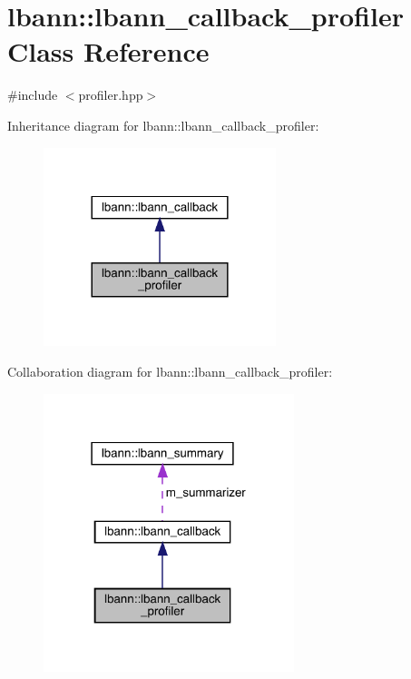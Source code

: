 \hypertarget{classlbann_1_1lbann__callback__profiler}{}\section{lbann\+:\+:lbann\+\_\+callback\+\_\+profiler Class Reference}
\label{classlbann_1_1lbann__callback__profiler}


{\ttfamily \#include $<$profiler.\+hpp$>$}



Inheritance diagram for lbann\+:\+:lbann\+\_\+callback\+\_\+profiler\+:\nopagebreak
\begin{figure}[H]
\begin{center}
\leavevmode
\includegraphics[width=192pt]{classlbann_1_1lbann__callback__profiler__inherit__graph}
\end{center}
\end{figure}


Collaboration diagram for lbann\+:\+:lbann\+\_\+callback\+\_\+profiler\+:\nopagebreak
\begin{figure}[H]
\begin{center}
\leavevmode
\includegraphics[width=207pt]{classlbann_1_1lbann__callback__profiler__coll__graph}
\end{center}
\end{figure}
